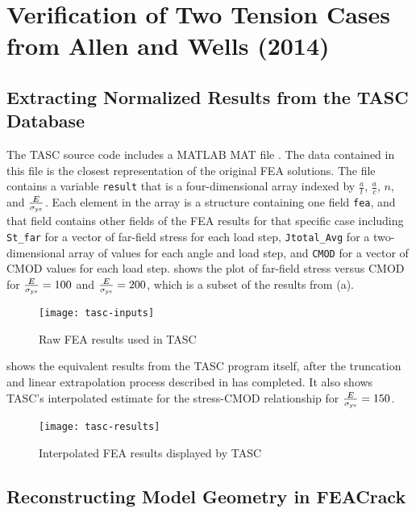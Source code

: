 \chapter{Verification of Two Tension Cases from Allen and Wells (2014)} \label{chap:app-verification-allen-wells}

\section{Extracting Normalized Results from the TASC Database}

The TASC source code \citep{tasc} includes a MATLAB MAT file .
The data contained in this file is the closest representation of the original FEA solutions.
The file contains a variable \verb|result| that is a four-dimensional array indexed by \(\frac{a}{t}\), \(\frac{a}{c}\), \(n\), and \(\frac{E}{\sigma_{\textnormal{ys}}}\).
Each element in the array is a structure containing one field \verb|fea|, and that field contains other fields of the FEA results for that specific case including \verb|St_far| for a vector of far-field stress for each load step, \verb|Jtotal_Avg| for a two-dimensional array of \J values for each angle and load step, and \verb|CMOD| for a vector of CMOD values for each load step.
 shows the plot of far-field stress versus CMOD for \(\frac{E}{\sigma_{\textnormal{ys}}} = 100\) and \(\frac{E}{\sigma_{\textnormal{ys}}} = 200\), which is a subset of the results from (a).
\begin{figure}[bp]
\centering
\texttt{[image: tasc-inputs]}
\caption{\label{fig:tasc_fea_inputs} Raw FEA results used in TASC}
\end{figure}
 shows the equivalent results from the TASC program itself, after the truncation and linear extrapolation process described in \citeauthor[p.~180]{allenwells2014} has completed.
It also shows TASC's interpolated estimate for the stress-CMOD relationship for \(\frac{E}{\sigma_{\textnormal{ys}}} = 150\).
\begin{figure}[tbp]
\centering
\texttt{[image: tasc-results]}
\caption{\label{fig:tasc_interp_outputs} Interpolated FEA results displayed by TASC}
\end{figure}

\section{Reconstructing Model Geometry in FEACrack}

